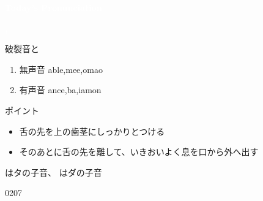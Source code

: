 \documentclass[aspectratio=169,xcolor={dvipsnames,table}]{beamer}
\begin{document}
\begin{frame}

\centering
  \textcolor{white}{\Huge\bfseries Today's Pronunciation}\pause

 \vspace{30pt}

  \textcolor{white}{\Huge\bfseries {}, }

\vfill

\end{frame}
\begin{frame}[plain, label=slide_t_d]{破裂音と}

\large

\begin{enumerate}
 \item  無声音 \hspace{20pt}able,\hspace{1\zw}mee,\hspace{1\zw}omao
 \item  有声音 \hspace{18pt}ance,\hspace{1\zw}ba,\hspace{1\zw}iamon

\end{enumerate}

\vspace*{20pt}

\normalsize
ポイント

\begin{itemize}[circle]
 \item 舌の先を上の歯茎にしっかりとつける
 \item そのあとに舌の先を離して、いきおいよく息を口から外へ出す
 \end{itemize}

はタの子音、
はダの子音

\hfill{\tiny 0207}\,{\scriptsize {}}


\end{frame}
\end{document}

